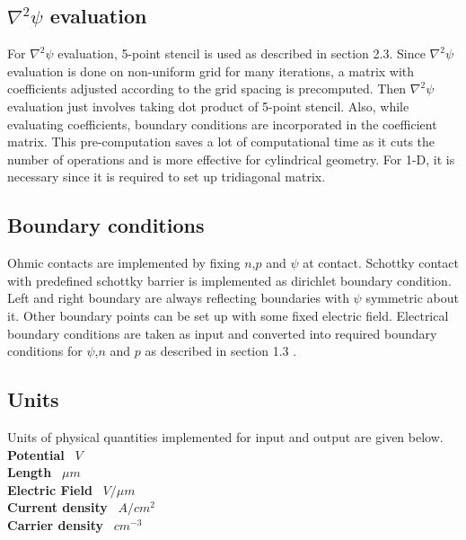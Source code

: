 \subsection{$\nabla^2\psi$ evaluation}
For $\nabla^2\psi$ evaluation, 5-point stencil is used as described in section 2.3.
Since $\nabla^2\psi$ evaluation is done on non-uniform grid for many iterations, a matrix with coefficients adjusted according to the grid spacing is precomputed. Then $\nabla^2\psi$ evaluation just involves taking dot product of 5-point stencil. Also, while evaluating coefficients, boundary conditions are incorporated in the coefficient matrix.
This pre-computation saves a lot of computational time as it cuts the number of operations and is more effective for cylindrical geometry. For 1-D, it is necessary since it is required to set up tridiagonal matrix. 

\subsection{Boundary conditions}

Ohmic contacts are implemented by fixing $n$,$p$ and $\psi$ at contact. Schottky contact with predefined schottky barrier is implemented as dirichlet boundary condition. Left and right boundary are always reflecting boundaries with $\psi$ symmetric about it. Other boundary points can be set up with some fixed electric field.
Electrical boundary conditions are taken as input and converted into required boundary conditions for $\psi$,$n$ and $p$ as described in section 1.3 .

\subsection{Units}
Units of physical quantities implemented for input and output are given below.
\textbf{Potential} \textrightarrow\ $V$ \\
\textbf{Length} \textrightarrow\ $\mu m$ \\
\textbf{Electric Field} \textrightarrow\ $V/\mu m$ \\
\textbf{Current density} \textrightarrow\  $A/cm^2$ \\
\textbf{Carrier density} \textrightarrow\  $cm^{-3}$ \\

